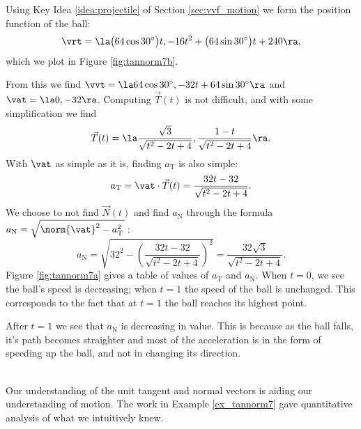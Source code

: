 {Using Key Idea \ref{idea:projectile} of Section \ref{sec:vvf_motion} we form the position function of the ball:
$$\vrt = \la \big(64\cos 30^\circ\big)t, -16t^2+\big(64\sin 30^\circ\big)t+240\ra,$$
which we plot in Figure \ref{fig:tannorm7b}.

From this we find $\vvt = \la 64\cos 30^\circ, -32t+64\sin 30^\circ\ra$ and $\vat = \la 0,-32\ra$. Computing $\vec T(t)$ is not difficult, and with some simplification we find
$$\vec T(t) = \la \frac{\sqrt{3}}{\sqrt{t^2-2t+4}}, \frac{1-t}{\sqrt{t^2-2t+4}}\ra.$$
With $\vat$ as simple as it is, finding $a_\text{T}$ is also  simple:
$$a_\text{T} = \vat\cdot \vec T(t) = \frac{32t-32}{\sqrt{t^2-2t+4}}.$$
We choose to not find $\vec N(t)$ and find $a_\text{N}$ through the formula $a_\text{N} = \sqrt{\norm{\vat}^2-a_\text{T}^2\,}$\,:
$$a_\text{N} = \sqrt{32^2-\left(\frac{32t-32}{\sqrt{t^2-2t+4}}\right)^2} = \frac{32\sqrt{3}}{\sqrt{t^2-2t+4}}.$$
Figure \ref{fig:tannorm7a} gives a table of values of $a_\text{T}$ and $a_\text{N}$. When $t=0$, we see the ball's speed is decreasing; when $t=1$ the speed of the ball is unchanged. This corresponds to the fact that at $t=1$ the ball reaches its highest point.

After $t=1$ we see that $a_\text{N}$ is decreasing in value. This is because as the ball falls, it's path becomes straighter and most of the acceleration is in the form of speeding up the ball, and not in changing its direction.
}\\

Our understanding of the unit tangent and normal vectors is aiding our understanding of motion. The work in Example \ref{ex_tannorm7} gave quantitative analysis of what we intuitively knew.

